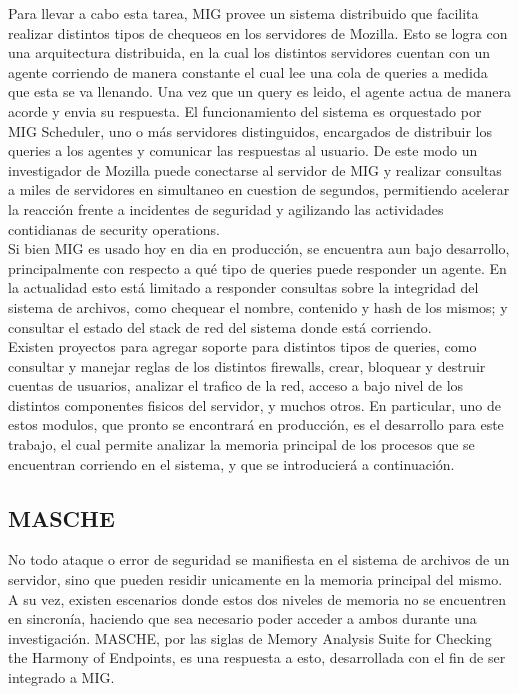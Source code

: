 Para llevar a cabo esta tarea, MIG provee un sistema distribuido que facilita
realizar distintos tipos de chequeos en los servidores de Mozilla. Esto se
logra con una arquitectura distribuida, en la cual los distintos servidores
cuentan con un agente corriendo de manera constante el cual lee una cola de
queries a medida que esta se va llenando. Una vez que un
query es leido, el agente actua de manera acorde y envia su respuesta.
El funcionamiento del sistema es orquestado por MIG Scheduler, uno o
más servidores distinguidos, encargados de distribuir los queries a
los agentes y comunicar las respuestas al usuario. De este modo un investigador
de Mozilla puede conectarse al servidor de MIG y realizar consultas a miles de
servidores en simultaneo en cuestion de segundos, permitiendo acelerar la
reacción frente a incidentes de seguridad y agilizando las actividades
contidianas de security operations.\\

Si bien MIG es usado hoy en dia en producción, se encuentra aun bajo
desarrollo, principalmente con respecto a qué tipo de queries puede
responder un agente. En la actualidad esto está limitado a responder consultas
sobre la integridad del sistema de archivos, como chequear el nombre, contenido
y hash de los mismos; y consultar el estado del stack de red del sistema donde
está corriendo.\\

Existen proyectos para agregar soporte para distintos tipos de queries, como
consultar y manejar reglas de los distintos firewalls, crear, bloquear y
destruir cuentas de usuarios, analizar el trafico de la red, acceso a bajo
nivel de los distintos componentes fisicos del servidor, y muchos otros. En
particular, uno de estos modulos, que pronto se encontrará en producción, es el
desarrollo para este trabajo, el cual permite analizar la memoria principal de
los procesos que se encuentran corriendo en el sistema, y que se introducierá a
continuación.\\

\subsection{MASCHE}

No todo ataque o error de seguridad se manifiesta en el sistema de archivos de
un servidor, sino que pueden residir unicamente en la memoria principal del
mismo. A su vez, existen escenarios donde estos dos niveles de memoria no se
encuentren en sincronía, haciendo que sea necesario poder acceder a ambos
durante una investigación. MASCHE, por las siglas de Memory Analysis Suite for
Checking the Harmony of Endpoints, es una respuesta a esto, desarrollada con el
fin de ser integrado a MIG.\\

